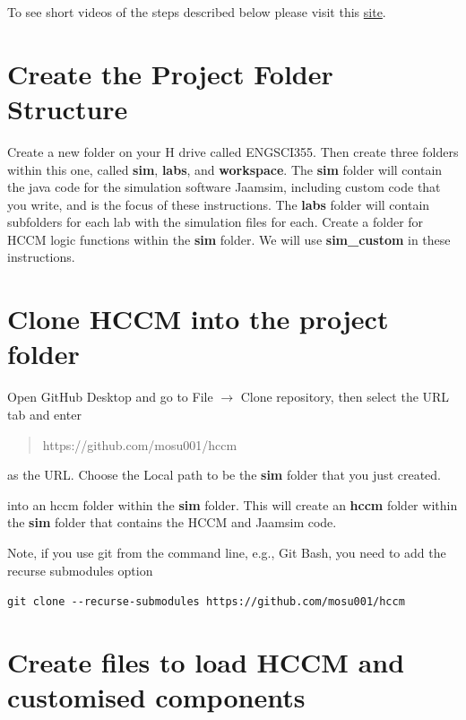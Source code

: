 \documentclass[
  10pt,
  a4paperpaper,
  DIV=11,
  numbers=noendperiod,
  oneside]{scrreprt}
\begin{document}
To see short videos of the steps described below please visit this
\href{https://auckland.au.panopto.com/Panopto/Pages/Sessions/List.aspx?folderID=59000722-14f5-4215-8948-b22501731784}{site}.

\section{Create the Project Folder
Structure}\label{create-the-project-folder-structure}

Create a new folder on your H drive called ENGSCI355. Then create three
folders within this one, called \textbf{sim}, \textbf{labs}, and
\textbf{workspace}. The \textbf{sim} folder will contain the java code
for the simulation software Jaamsim, including custom code that you
write, and is the focus of these instructions. The \textbf{labs} folder
will contain subfolders for each lab with the simulation files for each.
Create a folder for HCCM logic functions within the \textbf{sim} folder.
We will use \textbf{sim\_custom} in these instructions.

\section{Clone HCCM into the project
folder}\label{clone-hccm-into-the-project-folder}

Open GitHub Desktop and go to File \(\rightarrow\) Clone repository,
then select the URL tab and enter

\begin{quote}
https://github.com/mosu001/hccm
\end{quote}

as the URL. Choose the Local path to be the \textbf{sim} folder that you
just created.

into an hccm folder within the \textbf{sim} folder. This will create an
\textbf{hccm} folder within the \textbf{sim} folder that contains the
HCCM and Jaamsim code.

Note, if you use git from the command line, e.g., Git Bash, you need to
add the recurse submodules option

\texttt{git\ clone\ -\/-recurse-submodules\ https://github.com/mosu001/hccm}

\section{Create files to load HCCM and customised
components}\label{create-files-to-load-hccm-and-customised-components}
\end{document}
